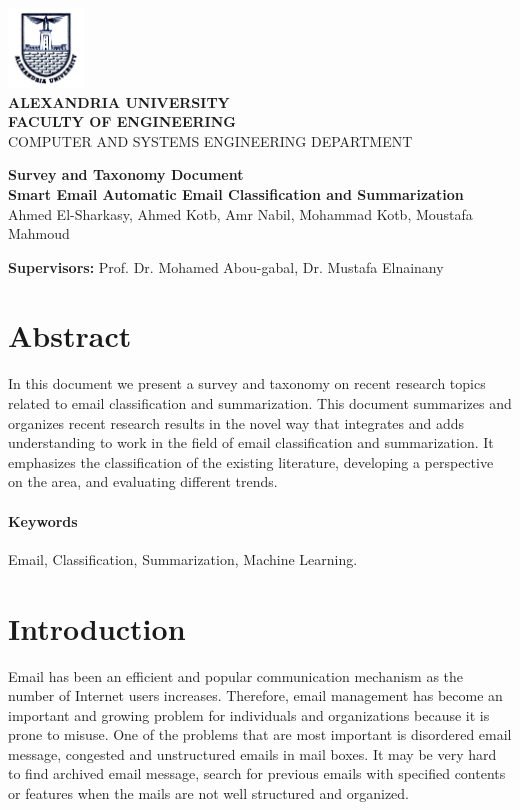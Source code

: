 \documentclass[12pt]{article}
\begin{document}
\begin{titlepage}
\vspace{-1.5cm}
\begin{center}
\includegraphics[width=2cm]{Logo_Alexandria_University.jpg}\\
\vspace{1cm}
\textbf{\large ALEXANDRIA UNIVERSITY} \\
\textbf{FACULTY OF ENGINEERING} \\
{\small  COMPUTER AND SYSTEMS ENGINEERING DEPARTMENT}

\vspace{2.5cm}
\textbf{\LARGE Survey and Taxonomy Document}\\
\textbf{\small Smart Email Automatic Email Classification and Summarization}\\
\vspace{1cm}
{ Ahmed El-Sharkasy, Ahmed Kotb, Amr Nabil, Mohammad Kotb, Moustafa Mahmoud }
\end{center}

\vspace{1ex}
\textbf{Supervisors:} Prof. Dr. Mohamed Abou-gabal, Dr. Mustafa Elnainany
\end{titlepage}

\newpage
\tableofcontents
\newpage

\section{Abstract}
In this document we present a survey and taxonomy on recent research topics 
related to email classification and summarization. This document summarizes 
and organizes recent research results in the novel way that integrates and 
adds understanding to work in the field of email classification and 
summarization. It emphasizes the classification of the existing literature, 
developing a perspective on the area, and evaluating different trends.

\paragraph{Keywords}
Email, Classification, Summarization, Machine Learning.

\section{Introduction}
Email has been an efficient and popular communication mechanism as the 
number of Internet users increases. Therefore, email management has become 
an important and growing problem for individuals and organizations because 
it is prone to misuse. One of the problems that are most important is disordered 
email message, congested and unstructured emails in mail boxes. It may be very 
hard to find archived email message, search for previous emails with specified 
contents or features when the mails are not well structured and organized.
\end{document}
